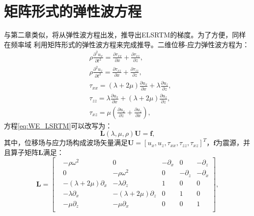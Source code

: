 \section{矩阵形式的弹性波方程}
与第二章类似，将从弹性波方程出发，推导出ELSRTM的梯度。为了方便，同样在频率域
利用矩阵形式的弹性波方程来完成推导。二维位移-应力弹性波方程为：
\begin{equation}
\begin{split}
   & \rho\frac{\partial^2 u_{x}}{\partial t^2}=	\frac{\partial \tau_{xx}}{\partial x}+
		\frac{\partial \tau_{xz}}{\partial z},\\
   & \rho\frac{\partial^2 u_{z}}{\partial t^2}=	\frac{\partial \tau_{xz}}{\partial x}+
		\frac{\partial \tau_{zz}}{\partial z},\\
   & \tau_{xx}=(\lambda+2\mu)\frac{\partial u_x}{\partial x}+\lambda\frac{\partial u_z}{\partial z},\\
   & \tau_{zz}=\lambda\frac{\partial u_x}{\partial x}+(\lambda+2\mu)\frac{\partial u_z}{\partial z},\\
   & \tau_{xz}=\mu(\frac{\partial u_x}{\partial z} + \frac{\partial u_z}{\partial x}),
    \label{eq:WE_LSRTM}
\end{split}
\end{equation}
方程\eqref{eq:WE_LSRTM}可以改写为：
\begin{equation}
\mathbf{L}(\lambda,\mu,\rho)\mathbf{U}=\mathbf{f},
    \label{eq:WE_Matrix} 
\end{equation}
其中，位移场与应力场构成波场矢量满足$\mathbf{U}=[u_x,u_z,\tau_{xx},\tau_{zz},\tau_{xz}]^T$，$\mathbf{f}$为震源，并且算子矩阵$\mathbf{L}$满足：
\begin{equation}
        \mathbf{L}
        =
        \begin{bmatrix}
			&-\rho\omega^2 &0 &-\partial_x & 0 &-\partial_z\\
			& 0  &-\rho\omega^2 &0 &-\partial_z &-\partial_x\\
			&-(\lambda+2\mu)\partial_x &-\lambda\partial_z &1 &0&0\\
			& -\lambda\partial_x  &-(\lambda+2\mu)\partial_z &0 &1&0\\
			& -\mu\partial_z  &-\mu\partial_x &0 &0&1\\
        \end{bmatrix},
        \label{eq:L}
\end{equation}
